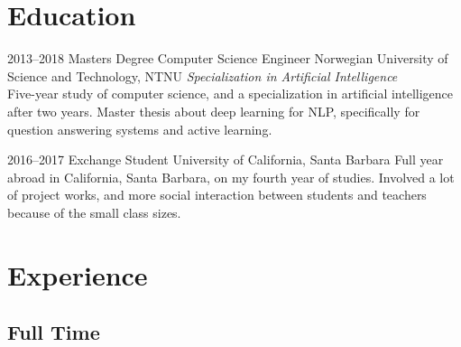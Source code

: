\documentclass[]{friggeri-cv} %
\begin{document}
\section{Education}

\begin{entrylist}


\entry
{2013--2018}
{Masters Degree {\normalfont Computer Science Engineer}}
{Norwegian University of Science and Technology, NTNU}
{\emph{Specialization in Artificial Intelligence} \\ Five-year study of computer science, and a specialization in artificial intelligence after two years. Master thesis about deep learning for NLP, specifically for question answering systems and active learning.}


\entry
{2016--2017}
{Exchange Student}
{University of California, Santa Barbara}
{Full year abroad in California, Santa Barbara, on my fourth year of studies. Involved a lot of project works, and more social interaction between students and teachers because of the small class sizes.}


\end{entrylist}


\section{Experience}

\subsection{Full Time}
\end{document}
